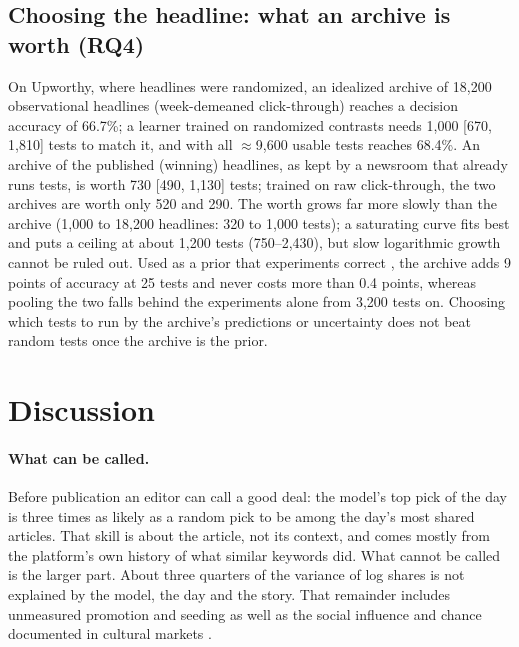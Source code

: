 \documentclass[10pt,a4paper,twocolumn]{article}
\begin{document}
\subsection{Choosing the headline: what an archive is worth (RQ4)}
\label{sec:rq4}
On Upworthy, where headlines were randomized, an idealized archive of 18{,}200 observational headlines (week-demeaned
click-through) reaches a decision accuracy of 66.7\%; a learner trained on randomized contrasts needs 1{,}000 [670,
1{,}810] tests to match it, and with all $\approx$9{,}600 usable tests reaches 68.4\%. An archive of the published
(winning) headlines, as kept by a newsroom that already runs tests, is worth 730 [490, 1{,}130] tests; trained on raw
click-through, the two archives are worth only 520 and 290. The worth grows far more slowly than the archive
(1{,}000 to 18{,}200 headlines: 320 to 1{,}000 tests); a saturating curve fits best and puts a ceiling at about
1{,}200 tests (750--2{,}430), but slow logarithmic growth cannot be ruled out. Used as a prior that experiments
correct \citep{kallus2018}, the archive adds 9 points of accuracy at 25 tests and never costs more than 0.4 points,
whereas pooling the two falls behind the experiments alone from 3{,}200 tests on. Choosing which tests to run by the
archive's predictions or uncertainty does not beat random tests once the archive is the prior.

\section{Discussion}
\label{sec:discussion}
\paragraph{What can be called.} Before publication an editor can call a good deal: the model's top pick of the day
is three times as likely as a random pick to be among the day's most shared articles. That skill is about the
article, not its context, and comes mostly from the platform's own history of what similar keywords did. What
cannot be called is the larger part. About three quarters of the variance of log shares is not explained by the
model, the day and the story. That remainder includes unmeasured promotion and seeding as well as the social
influence and chance documented in cultural markets \citep{salganik2006,martin2016}.
\end{document}

